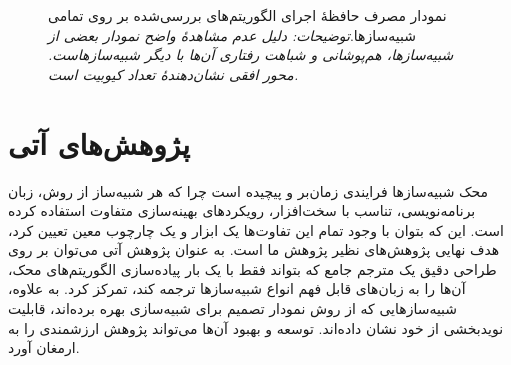 \begin{figure}
	\centering
	\begin{subfigure}[b]{0.3\textwidth}
		\centering
		
		\label{fig:4.2.1}
	\end{subfigure}
	\hfill
	\begin{subfigure}[b]{0.3\textwidth}
		\centering
		
		\label{fig:4.2.2}
	\end{subfigure}
	\hfill
	\begin{subfigure}[b]{0.3\textwidth}
		\centering
		
		\label{fig:4.2.3}
	\end{subfigure}
	\vspace{1em} %
	
	\begin{subfigure}[b]{0.3\textwidth}
		\centering
		
		\label{fig:4.2.4}
	\end{subfigure}
	\hfill
	\begin{subfigure}[b]{0.3\textwidth}
		\centering
		
		\label{fig:4.2.5}
	\end{subfigure}
	\hfill
	\begin{subfigure}[b]{0.3\textwidth}
		\centering
		
		\label{fig:4.2.6}
	\end{subfigure}
	
	\captionsetup{justification=centering}
	\caption{
		نمودار مصرف حافظهٔ اجرای الگوریتم‌های بررسی‌شده بر روی تمامی شبیه‌سازها.\newline \textit{توضیحات: دلیل عدم مشاهد‌هٔ واضح نمودار بعضی از شبیه‌سازها، هم‌پوشانی و شباهت رفتاری آن‌ها با دیگر شبیه‌سازهاست. محور افقی نشان‌دهندهٔ تعداد کیوبیت است.}
	}
	\label{fig:4.2}
\end{figure}

\section{پژوهش‌های آتی}
محک شبیه‌سازها فرایندی زمان‌بر و پیچیده است چرا که هر شبیه‌ساز از روش، زبان
برنامه‌نویسی، تناسب با سخت‌افزار، رویکردهای بهینه‌سازی متفاوت استفاده کرده است. این که بتوان با وجود تمام این تفاوت‌ها یک ابزار و یک چارچوب معین تعیین کرد، هدف نهایی پژوهش‌های نظیر پژوهش ما است. به عنوان پژوهش آتی می‌توان بر روی طراحی دقیق یک مترجم جامع که بتواند فقط با یک بار پیاده‌سازی الگوریتم‌های محک، آن‌ها را به زبان‌های قابل فهم انواع شبیه‌ساز‌ها ترجمه کند، تمرکز کرد. به علاوه، شبیه‌سازهایی که از روش‌ نمودار تصمیم برای شبیه‌سازی بهره برده‌اند،‌ قابلیت نویدبخشی از خود نشان داده‌اند. توسعه‌ و بهبود آن‌ها می‌تواند پژوهش ارزشمندی را به ارمغان آورد.







